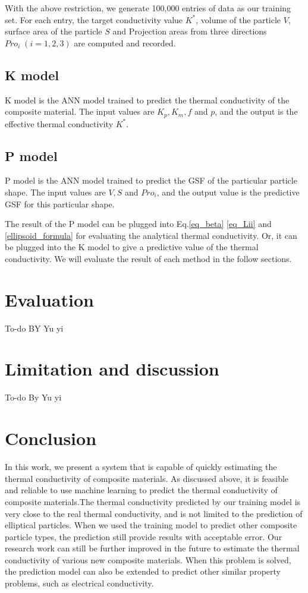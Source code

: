 \documentclass[conference,compsoc]{IEEEtran}
\begin{document}
With the above restriction, we generate 100,000 entries of data as our training set. For each entry, the target conductivity value $K^*$, volume of the particle $V$, surface area of the particle $S$ and Projection areas from three directions $Pro_i \; (i = 1,2,3)$ are computed and recorded.
\subsection{K model}
K model is the ANN model trained to predict the thermal conductivity of the composite material. The input values are $K_p, K_m, f$ and $p$, and the output is the effective thermal conductivity $K^*$.
\subsection{P model}
P model is the ANN model trained to predict the GSF of the particular particle shape. The input values are $V, S$ and $Pro_{i}$, and the output value is the predictive GSF for this particular shape.

The result of the P model can be plugged into Eq.\ref{eq_beta} \ref{eq_Lii} and \ref{ellipsoid_formula} for evaluating the analytical thermal conductivity. Or, it can be plugged into the K model to give a predictive value of the thermal conductivity. We will evaluate the result of each method in the follow sections.
\section{Evaluation}
To-do BY Yu yi
\section{Limitation and discussion}
To-do By Yu yi

\section{Conclusion}
In this work, we present a system that is capable of quickly estimating the thermal conductivity of composite materials. As discussed above, it is feasible and reliable to use machine learning to predict the thermal conductivity of composite materials.The thermal conductivity predicted by our training model is very close to the real thermal conductivity, and is not limited to the prediction of elliptical particles. When we used the training model to predict other composite particle types, the prediction still provide results with acceptable error. Our research work can still be further improved in the future to estimate the thermal conductivity of various new composite materials. When this problem is solved, the prediction model can also be extended to predict other similar property problems, such as electrical conductivity.
\end{document}
